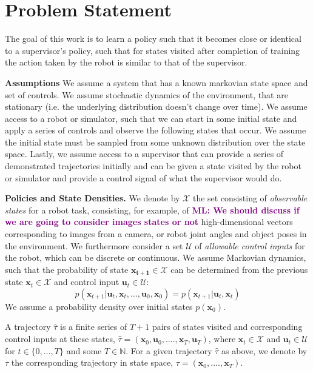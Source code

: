 \documentclass[10pt, conference]{ieeeconf}      %
\newcommand{\bu}{\mathbf{u}}
\newcommand{\bx}{\mathbf{x}}
\newcommand{\mlnote}[1]{\ifthenelse{\boolean{include-notes}}%
 {\textcolor{purple}{\textbf{ML: #1}}}{}}
\begin{document}
\section{Problem Statement}
The goal of this work is to learn a policy such that it becomes close or identical to a supervisor's policy, such that for states visited after completion of training the action taken by the robot is similar to that of the supervisor.

\noindent\textbf{Assumptions} We assume a system that has a known markovian state space and set of controls. We assume stochastic dynamics of the environment, that are stationary (i.e. the underlying distribution doesn't change over time). We assume access to a robot or simulator, such that we can start in some initial state and apply a series of controls and observe the following states that occur. We assume the initial state must be sampled from some unknown distribution over the state space. Lastly, we assume access to a supervisor that can provide a series of demonstrated trajectories initially and can be given a state visited by the robot or simulator and provide a control signal of what the supervisor would do. 

\noindent\textbf{Policies and State Densities.}
We denote by $\mathcal{X}$ the set consisting of \emph{observable states} for a robot task, consisting, for example, of \mlnote{We should discuss if we are going to consider images states or not}
high-dimensional vectors corresponding to images from a camera, or robot joint angles and object poses in the environment.
We furthermore consider a set $\mathcal{U}$ of \emph{allowable control inputs} for the robot, which can be discrete or
continuous. We assume Markovian dynamics, such that the probability of state $\mathbf{x_{t+1}}\in
\mathcal{X}$ can be determined from the previous state $\mathbf{x}_t\in\mathcal{X}$ and control input $\mathbf{u}_t\in
\mathcal{U}$: 
$$p(\bx_{t+1}|\bu_{t},\bx_{t}, \ldots, \bu_{0}, \bx_{0})=p(\bx_{t+1}|\bu_{t}, \bx_t)$$
We assume a probability density over initial states $p(\bx_0)$.

A trajectory $\hat{\tau}$ is a finite series of $T+1$ pairs of states visited and corresponding
control inputs at these states, $\hat{\tau} = (\mathbf{x}_0,\mathbf{u}_0, ...., \mathbf{x}_T,\mathbf{u}_T)$, where $\bx_t\in \mathcal{X}$
and $\bu_t\in \mathcal{U}$ for $t\in \{0, \ldots, T\}$ and some $T\in \mathbb{N}$.  
For a given trajectory $\hat{\tau}$ as above, we denote by ${\tau}$ the corresponding trajectory in state space,
${\tau} = (\bx_0,....,\bx_T)$.
\end{document}

